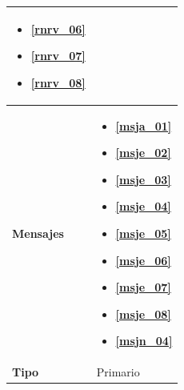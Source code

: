 \begin{center}
\begin{longtable}{| p{3.5cm} | p{11.5cm} |}
\begin{itemize}
               \item \textbf{\ref{rnrv_06}}
               \item \textbf{\ref{rnrv_07}}
               \item \textbf{\ref{rnrv_08}}
             \end{itemize} \\
        \hline
           \textbf{Mensajes} & 
              \begin{itemize}
                 \item \textbf{\ref{msja_01}}
                 \item \textbf{\ref{msje_02}}
                 \item \textbf{\ref{msje_03}}
                 \item \textbf{\ref{msje_04}}
                 \item \textbf{\ref{msje_05}}
                 \item \textbf{\ref{msje_06}}
                 \item \textbf{\ref{msje_07}}
                 \item \textbf{\ref{msje_08}}
                 \item \textbf{\ref{msjn_04}}
              \end{itemize}\\
        \hline
           \textbf{Tipo} & Primario \\
        \hline	    
  \end{longtable}
\end{center}
\endgroup

